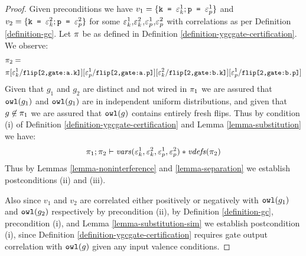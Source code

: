 \begin{proof}
  Given preconditions we have $v_1 =  \{ \texttt{k = }\varepsilon^1_{k}; \texttt{p = }\varepsilon^1_{p} \}$ and
  $v_2 = \{ \texttt{k = }\varepsilon^2_{k}; \texttt{p = }\varepsilon^2_{p} \}$ for some
  $\varepsilon^1_{k}$,$\varepsilon^2_{k}$,$\varepsilon^1_{p}$,$\varepsilon^2_{p}$ with correlations as per Definition
  \ref{definition-gc}.
  Let $\pi$ be as defined in Definition \ref{definition-ygcgate-certification}.
  We observe:
  \begin{eqnarray*}
    &\pi_2 = \\
    &{\small \pi[\varepsilon^1_{k}/\texttt{flip[2,gate:a.k]}][\varepsilon^1_{p}/\texttt{flip[2,gate:a.p]}][\varepsilon^2_{k}/\texttt{flip[2,gate:b.k]}][\varepsilon^1_{p}/\texttt{flip[2,gate:b.p]}]}
  \end{eqnarray*}
  Given that $g_1$ and $g_2$ are distinct and not wired in $\pi_1$
  we are assured that $\texttt{owl}(g_1)$ and $\texttt{owl}(g_1)$ are in
  independent uniform distributions, and given that $g \not\in
  \pi_1$ we are assured that $\texttt{owl}(g)$ contains entirely fresh
  flips. Thus by condition (i) of Definition \ref{definition-ygcgate-certification} and
  Lemma \ref{lemma-substitution} we have:
  $$
  \pi_1;\pi_2 \vdash \mathit{vars}(\varepsilon^1_{k},\varepsilon^2_{k},\varepsilon^1_{p},\varepsilon^2_{p}) * \mathit{vdefs}(\pi_2)
  $$
  Thus by Lemmas \ref{lemma-noninterference} and \ref{lemma-separation} we establish
  postconditions (ii) and (iii).

  Also since $v_1$ and $v_2$ are correlated either positively or negatively with
  $\texttt{owl}(g_1)$ and $\texttt{owl}(g_2)$ respectively by precondition (ii),
  by Definition \ref{definition-gc}, precondition (i), and Lemma \ref{lemma-substitution-sim}
  we establish postcondition (i), since Definition \ref{definition-ygcgate-certification}
  requires gate output correlation with $\texttt{owl}(g)$ given any input valence conditions.
\end{proof}

\ygcencode*

